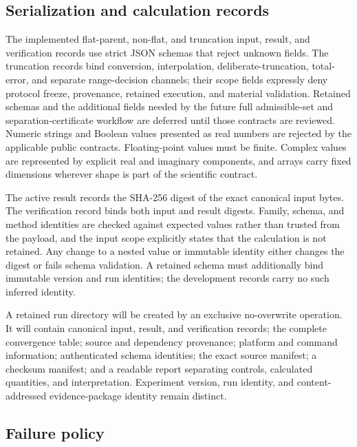 \documentclass[11pt]{article}
\begin{document}
\subsection{Serialization and calculation records}

The implemented flat-parent, non-flat, and truncation input, result, and verification
records use strict JSON schemas that reject unknown fields. The truncation records bind
conversion, interpolation, deliberate-truncation, total-error, and separate
range-decision channels; their scope fields expressly deny protocol freeze, provenance,
retained execution, and material validation. Retained schemas and the additional fields
needed by the future full admissible-set and separation-certificate workflow are deferred
until those contracts are reviewed. Numeric strings and Boolean values presented as real
numbers are rejected by the applicable public contracts.
Floating-point values must be finite. Complex values are represented by explicit real
and imaginary components, and arrays carry fixed dimensions wherever shape is part of
the scientific contract.

The active result records the SHA-256 digest of the exact canonical input bytes. The
verification record binds both input and result digests. Family, schema, and method
identities are checked against expected values rather than trusted from the payload, and
the input scope explicitly states that the calculation is not retained. Any change to a
nested value or immutable identity either changes the digest or fails schema validation.
A retained schema must additionally bind immutable version and run identities; the
development records carry no such inferred identity.

A retained run directory will be created by an exclusive no-overwrite operation. It will
contain canonical input, result, and verification records; the complete convergence table;
source and dependency provenance; platform and command information; authenticated
schema identities; the exact source manifest; a checksum manifest; and a readable
report separating controls, calculated quantities, and interpretation. Experiment
version, run identity, and content-addressed evidence-package identity remain distinct.

\subsection{Failure policy}
\end{document}
